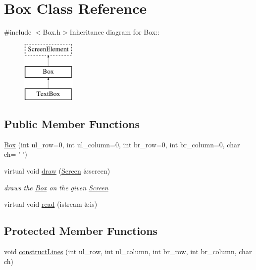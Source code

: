\hypertarget{classBox}{
\section{Box Class Reference}
\label{classBox}
}


{\ttfamily \#include $<$Box.h$>$}Inheritance diagram for Box::\begin{figure}[H]
\begin{center}
\leavevmode
\includegraphics[height=3cm]{classBox}
\end{center}
\end{figure}
\subsection*{Public Member Functions}
\begin{DoxyCompactItemize}
\item 
\hyperlink{classBox_a77fa7ad8be8934cbe9c3bcc86ca33998}{Box} (int ul\_\-row=0, int ul\_\-column=0, int br\_\-row=0, int br\_\-column=0, char ch= ' ')
\item 
virtual void \hyperlink{classBox_a5c6c1c650b13f2978e3b559bb5af15d2}{draw} (\hyperlink{classScreen}{Screen} \&screen)
\begin{DoxyCompactList}\small\item\em draws the \hyperlink{classBox}{Box} on the given \hyperlink{classScreen}{Screen} \item\end{DoxyCompactList}\item 
virtual void \hyperlink{classBox_ac0ea633a10bf980901766b7aaefdb912}{read} (istream \&is)
\end{DoxyCompactItemize}
\subsection*{Protected Member Functions}
\begin{DoxyCompactItemize}
\item 
void \hyperlink{classBox_a5411fa40529560030450d1eee001623d}{constructLines} (int ul\_\-row, int ul\_\-column, int br\_\-row, int br\_\-column, char ch)
\end{DoxyCompactItemize}
